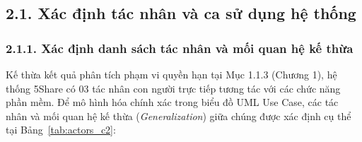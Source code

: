 \subsection{2.1. Xác định tác nhân và ca sử dụng hệ thống}

\subsubsection{2.1.1. Xác định danh sách tác nhân và mối quan hệ kế thừa}
Kế thừa kết quả phân tích phạm vi quyền hạn tại Mục 1.1.3 (Chương 1), hệ thống 5Share có 03 tác nhân con người trực tiếp tương tác với các chức năng phần mềm. Để mô hình hóa chính xác trong biểu đồ UML Use Case, các tác nhân và mối quan hệ kế thừa (\textit{Generalization}) giữa chúng được xác định cụ thể tại Bảng~\ref{tab:actors_c2}:

